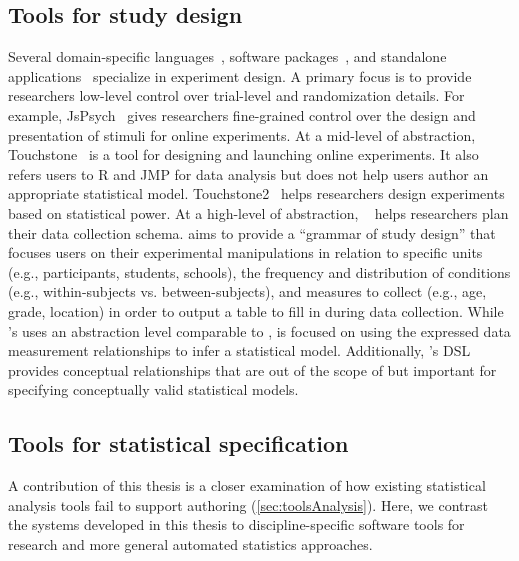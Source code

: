 \subsection{Tools for study design}
Several domain-specific languages~\cite{gosset,bakshy2014planout}, software
packages~\cite{edibble,blair2019declaring}, and standalone
applications~\cite{mackay2007touchstone,eiselmayer2019touchstone2} specialize in
experiment design. A primary focus is to provide researchers low-level control
over trial-level and randomization details. For example,
JsPsych~\cite{deLeeuw2015jspsych} gives researchers fine-grained control over
the design and presentation of stimuli for online experiments. At a mid-level of
abstraction, Touchstone~\cite{mackay2007touchstone} is a %
tool for designing and launching online experiments. It also refers users to R
and JMP for data analysis but does not help users author an appropriate
statistical model. Touchstone2~\cite{eiselmayer2019touchstone2} helps
researchers design experiments based on statistical power. At a high-level of
abstraction, \edibble~\cite{edibble} helps researchers plan their data collection
schema. \edibble aims to provide a ``grammar of study design'' that focuses users
on their experimental manipulations in relation to specific units (e.g.,
participants, students, schools), the frequency and distribution of conditions
(e.g., within-subjects vs. between-subjects), and measures to collect (e.g.,
age, grade, location) in order to output a table to fill in during data
collection. While \tisane's \SDSLlong uses an abstraction level comparable to
\edibble, \tisane is focused on using the expressed data measurement relationships
to infer a statistical model. Additionally, \tisane's DSL  provides conceptual
relationships that are out of the scope of \edibble but important for specifying
conceptually valid statistical models.


\subsection{Tools for statistical specification}
A contribution of this thesis is a closer examination of how existing
statistical analysis tools fail to support authoring
(\autoref{sec:toolsAnalysis}). Here, we contrast the systems developed in this
thesis to discipline-specific software tools for research and more general
automated statistics approaches. 

